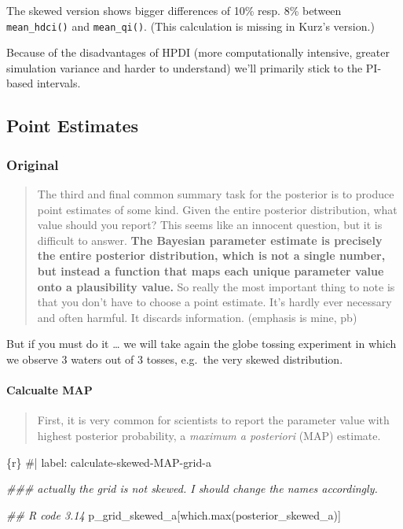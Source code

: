 \documentclass[
  letterpaper,
  DIV=11,
  numbers=noendperiod]{scrreprt}
\let\oldparagraph\paragraph
\renewcommand{\paragraph}[1]{\oldparagraph{#1}\mbox{}}
\newenvironment{Shaded}{\begin{snugshade}}{\end{snugshade}}
\newcommand{\CommentTok}[1]{\textcolor[rgb]{0.37,0.37,0.37}{#1}}
\newcommand{\DocumentationTok}[1]{\textcolor[rgb]{0.37,0.37,0.37}{\textit{#1}}}
\newcommand{\FunctionTok}[1]{\textcolor[rgb]{0.28,0.35,0.67}{#1}}
\newcommand{\InformationTok}[1]{\textcolor[rgb]{0.37,0.37,0.37}{#1}}
\newcommand{\NormalTok}[1]{\textcolor[rgb]{0.00,0.23,0.31}{#1}}
\begin{document}
The skewed version shows bigger differences of 10\% resp. 8\% between
\texttt{mean\_hdci()} and \texttt{mean\_qi()}. (This calculation is
missing in Kurz's version.)

Because of the disadvantages of HPDI (more computationally intensive,
greater simulation variance and harder to understand) we'll primarily
stick to the PI-based intervals.

\hypertarget{point-estimates}{%
\subsection{Point Estimates}\label{point-estimates}}

\hypertarget{original-13}{%
\subsubsection{Original}\label{original-13}}

\begin{quote}
The third and final common summary task for the posterior is to produce
point estimates of some kind. Given the entire posterior distribution,
what value should you report? This seems like an innocent question, but
it is difficult to answer. \textbf{The Bayesian parameter estimate is
precisely the entire posterior distribution, which is not a single
number, but instead a function that maps each unique parameter value
onto a plausibility value.} So really the most important thing to note
is that you don't have to choose a point estimate. It's hardly ever
necessary and often harmful. It discards information. (emphasis is mine,
pb)
\end{quote}

But if you must do it \ldots{} we will take again the globe tossing
experiment in which we observe 3 waters out of 3 tosses, e.g.~the very
skewed distribution.

\hypertarget{calcualte-map}{%
\paragraph{Calcualte MAP}\label{calcualte-map}}

\begin{quote}
First, it is very common for scientists to report the parameter value
with highest posterior probability, a \emph{maximum a posteriori} (MAP)
estimate.
\end{quote}

\begin{Shaded}
\begin{Highlighting}[]
\InformationTok{\textasciigrave{}\textasciigrave{}\textasciigrave{}\{r\}}
\CommentTok{\#| label: calculate{-}skewed{-}MAP{-}grid{-}a}

\DocumentationTok{\#\#\# actually the grid is not skewed. I should change the names accordingly.}

\DocumentationTok{\#\# R code 3.14}
\NormalTok{p\_grid\_skewed\_a[}\FunctionTok{which.max}\NormalTok{(posterior\_skewed\_a)]}
\InformationTok{\textasciigrave{}\textasciigrave{}\textasciigrave{}}
\end{Highlighting}
\end{Shaded}
\end{document}
